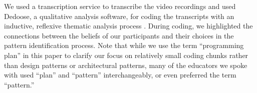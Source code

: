 



We used a transcription service to transcribe the video recordings and used Dedoose, a qualitative analysis software, for coding the transcripts with an inductive, reflexive thematic analysis process \cite{clarke2021thematic}. During coding, we highlighted the connections between the beliefs of our participants and their choices in the pattern identification process. 
Note that while we use the term ``programming plan'' in this paper to clarify our focus on relatively small coding chunks rather than design patterns or architectural patterns, many of the educators we spoke with used ``plan'' and ``pattern'' interchangeably, or even preferred the term ``pattern.''

